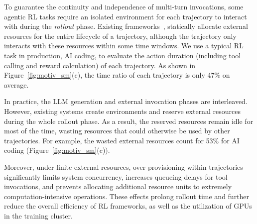 To guarantee the continuity and independence of multi-turn invocations, some agentic RL tasks require an isolated environment for each trajectory to interact with during the \textit{rollout} phase.
Existing frameworks~\citep{kubernetes}, statically allocate external resources for the entire lifecycle of a trajectory, although the trajectory only interacts with these resources within some time windows. 
We use a typical RL task in production, AI coding, to evaluate the action duration (including tool calling and reward calculation) of each trajectory.
As shown in Figure~\ref{fig:motiv_sm}(c), the time ratio of each trajectory is only 47\% on average. 

In practice, the LLM generation and external invocation phases are interleaved.
However, existing systems create environments and reserve external resources during the whole rollout phase.
As a result, the reserved resources remain idle for most of the time, wasting resources that could otherwise be used by other trajectories. 
For example, the wasted external resources count for 53\% for AI coding (Figure~\ref{fig:motiv_sm}(c)).

Moreover, under finite external resources, over-provisioning within trajectories significantly limits system concurrency, increases queueing delays for tool invocations, and prevents allocating additional resource units to extremely computation-intensive operations.
These effects prolong rollout time and further reduce the overall efficiency of RL frameworks, as well as the utilization of GPUs in the training cluster.

